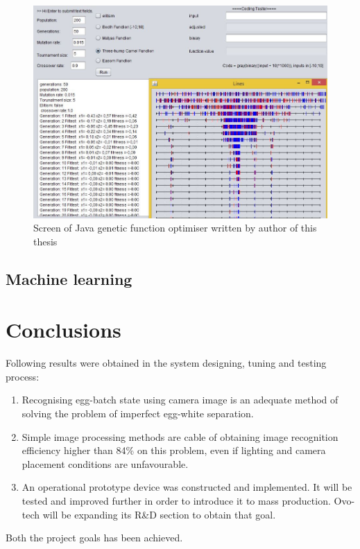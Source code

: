 \documentclass[12pt,twoside,a4paper]{article}
\begin{document}
\begin{figure}[H]
\centering
\includegraphics[width=0.7\paperwidth]{genetic}
\caption{Screen of Java genetic function optimiser written by author of this thesis \cite{morph}}
\end{figure}


\subsection{Machine learning}

\section{Conclusions}

Following results were obtained in the system designing, tuning and testing process:
\begin{enumerate}
\item Recognising egg-batch state using camera image is an adequate method of solving the problem of imperfect egg-white separation.
\item Simple image processing methods are cable of obtaining image recognition efficiency higher than 84\% on this problem, even if lighting and camera placement conditions are unfavourable.
\item An operational prototype device was constructed and implemented. It will be tested and improved further in order to introduce it to mass production. Ovo-tech will be expanding its R\&D section to obtain that goal.
\end{enumerate}

Both the project goals has been achieved.
\end{document}
